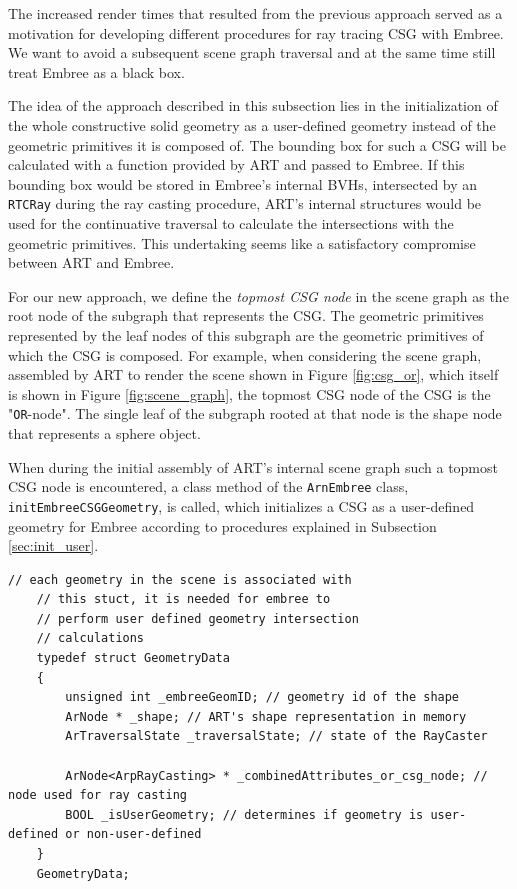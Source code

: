 The increased render times that resulted from the previous approach served as a motivation for developing different procedures for ray tracing CSG with Embree. We want to avoid a subsequent scene graph traversal and at the same time still treat Embree as a black box.

The idea of the approach described in this subsection lies in the initialization of the whole constructive solid geometry as a user-defined geometry instead of the geometric primitives it is composed of. The bounding box for such a CSG will be calculated with a function provided by ART and passed to Embree.
If this bounding box would be stored in Embree's internal BVHs, intersected by an \texttt{RTCRay} during the ray casting procedure, ART's internal structures would be used for the continuative traversal to calculate the intersections with the geometric primitives. This undertaking seems like a satisfactory compromise between ART and Embree.
 
For our new approach, we define the \emph{topmost CSG node} in the scene graph as the root node of the subgraph that represents the CSG. The geometric primitives represented by the leaf nodes of this subgraph are the geometric primitives of which the CSG is composed. For example, when considering the scene graph, assembled by ART to render the scene shown in Figure \ref{fig:csg_or}, which itself is shown in Figure \ref{fig:scene_graph}, the topmost CSG node of the CSG is the "\texttt{OR}-node". The single leaf of the subgraph rooted at that node is the shape node that represents a sphere object.

When during the initial assembly of ART's internal scene graph such a topmost CSG node is encountered, a class method of the \texttt{ArnEmbree} class, \texttt{initEmbreeCSGGeometry}, is called, which initializes  a CSG as a user-defined geometry for Embree according to procedures explained in Subsection \ref{sec:init_user}. 


\begin{listing} 
	\begin{lstlisting}[caption={Updated \texttt{GeometryData} struct for CSG rendering.}, label={lst:geometry_data_final}]
	// each geometry in the scene is associated with
	// this stuct, it is needed for embree to
	// perform user defined geometry intersection
	// calculations
	typedef struct GeometryData 
	{
		unsigned int _embreeGeomID; // geometry id of the shape
		ArNode * _shape; // ART's shape representation in memory
		ArTraversalState _traversalState; // state of the RayCaster
		
		ArNode<ArpRayCasting> * _combinedAttributes_or_csg_node; // node used for ray casting
		BOOL _isUserGeometry; // determines if geometry is user-defined or non-user-defined
	}
	GeometryData;
	\end{lstlisting}
\end{listing}

